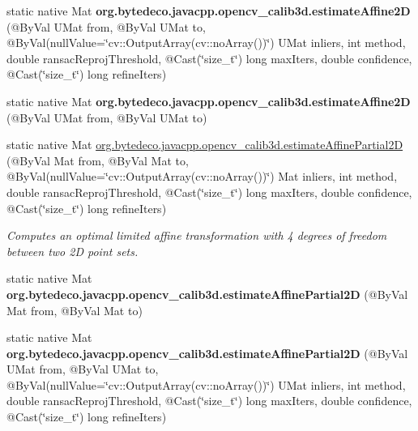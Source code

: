 \begin{DoxyCompactItemize}
static native Mat {\bfseries org.\+bytedeco.\+javacpp.\+opencv\+\_\+calib3d.\+estimate\+Affine2D} (@By\+Val U\+Mat from, @By\+Val U\+Mat to, @By\+Val(null\+Value=\char`\"{}cv\+::\+Output\+Array(cv\+::no\+Array())\char`\"{}) U\+Mat inliers, int method, double ransac\+Reproj\+Threshold, @Cast(\char`\"{}size\+\_\+t\char`\"{}) long max\+Iters, double confidence, @Cast(\char`\"{}size\+\_\+t\char`\"{}) long refine\+Iters)
\item 
\mbox{\label{group__calib3d_ga430cc49d1272d6192e912f57b7d9e023}} 
static native Mat {\bfseries org.\+bytedeco.\+javacpp.\+opencv\+\_\+calib3d.\+estimate\+Affine2D} (@By\+Val U\+Mat from, @By\+Val U\+Mat to)
\item 
static native Mat \hyperlink{group__calib3d_gab4e1d79cab0ae6448de411f9688836c8}{org.\+bytedeco.\+javacpp.\+opencv\+\_\+calib3d.\+estimate\+Affine\+Partial2D} (@By\+Val Mat from, @By\+Val Mat to, @By\+Val(null\+Value=\char`\"{}cv\+::\+Output\+Array(cv\+::no\+Array())\char`\"{}) Mat inliers, int method, double ransac\+Reproj\+Threshold, @Cast(\char`\"{}size\+\_\+t\char`\"{}) long max\+Iters, double confidence, @Cast(\char`\"{}size\+\_\+t\char`\"{}) long refine\+Iters)
\begin{DoxyCompactList}\small\item\em Computes an optimal limited affine transformation with 4 degrees of freedom between two 2D point sets. \end{DoxyCompactList}\item 
\mbox{\label{group__calib3d_gae0dc6fb9e85a298b978370b30f7d39df}} 
static native Mat {\bfseries org.\+bytedeco.\+javacpp.\+opencv\+\_\+calib3d.\+estimate\+Affine\+Partial2D} (@By\+Val Mat from, @By\+Val Mat to)
\item 
\mbox{\label{group__calib3d_ga4ad48b38e7fa18df7d244478c6a6f204}} 
static native Mat {\bfseries org.\+bytedeco.\+javacpp.\+opencv\+\_\+calib3d.\+estimate\+Affine\+Partial2D} (@By\+Val U\+Mat from, @By\+Val U\+Mat to, @By\+Val(null\+Value=\char`\"{}cv\+::\+Output\+Array(cv\+::no\+Array())\char`\"{}) U\+Mat inliers, int method, double ransac\+Reproj\+Threshold, @Cast(\char`\"{}size\+\_\+t\char`\"{}) long max\+Iters, double confidence, @Cast(\char`\"{}size\+\_\+t\char`\"{}) long refine\+Iters)
\item 
\mbox{\label{group__calib3d_gaa2232d47eb92ff3bc8d9a7bad61fee1c}} 

\end{DoxyCompactItemize}
